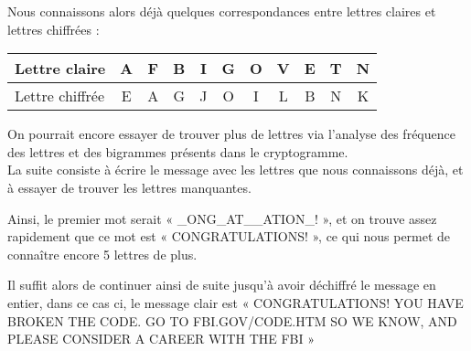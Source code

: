 Nous connaissons alors déjà quelques correspondances entre lettres
claires et lettres chiffrées : \\
\begin{center}
  \begin{tabular}{|l|c|c|c|c|c|c|c|c|c|c|}
    \hline
    Lettre claire & A & F & B & I & G & O & V & E & T & N \\
    \hline
    Lettre chiffrée & E & A & G & J & O & I & L & B & N & K \\
    \hline
  \end{tabular}
\end{center}
%
On pourrait encore essayer de trouver plus de lettres via
l'analyse des fréquence des lettres et des bigrammes présents dans
le cryptogramme.
\\

La suite consiste à écrire le message avec les lettres que nous
connaissons déjà, et à essayer de trouver les lettres manquantes.

Ainsi, le premier mot serait « \_ONG\_AT\_\_ATION\_! », et on trouve
assez rapidement que ce mot est « CONGRATULATIONS! », ce qui nous
permet de connaître encore 5 lettres de plus.

Il suffit alors de continuer ainsi de suite jusqu'à avoir
déchiffré le message en entier, dans ce cas ci, le message clair
est « CONGRATULATIONS! YOU HAVE BROKEN THE CODE. GO TO
FBI.GOV/CODE.HTM SO WE KNOW, AND PLEASE CONSIDER A CAREER WITH THE
FBI »

